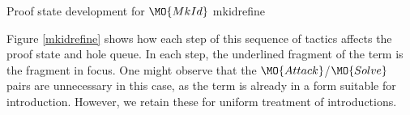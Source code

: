 {Proof state development for $\MO{MkId}$}
{mkidrefine}

Figure \ref{mkidrefine} shows how each step of this sequence of tactics affects
the proof state and hole queue. In each step, the underlined fragment of the
term is the fragment in focus. One might observe that the 
$\MO{Attack}$/$\MO{Solve}$ pairs are unnecessary in this case, as the term
is already in a form suitable for introduction. However, we retain these for
uniform treatment of introductions.


